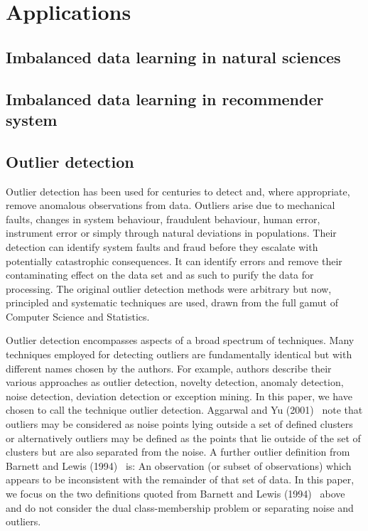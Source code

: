 \section{Applications}
\label{sec:application}
\subsection{Imbalanced data learning in natural sciences}
\subsection{Imbalanced data learning in recommender system}
\subsection{Outlier detection}
\noindent Outlier detection has been used for centuries to detect and, where appropriate, remove anomalous observations from data. Outliers arise due to mechanical faults, changes in system behaviour, fraudulent behaviour, human error, instrument error or simply through natural deviations in populations. Their detection can identify system faults and fraud before they escalate with potentially catastrophic consequences. It can identify errors and remove their contaminating effect on the data set and as such to purify the data for processing. The original outlier detection methods were arbitrary but now, principled and systematic techniques are used, drawn from the full gamut of Computer Science and Statistics.~\cite{ref_a1} 

Outlier detection encompasses aspects of a broad spectrum of techniques. Many techniques employed for detecting outliers are fundamentally identical but with different names chosen by the authors. For example, authors describe their various approaches as outlier detection, novelty detection, anomaly detection, noise detection, deviation detection or exception mining. In this paper, we have chosen to call the technique outlier detection. Aggarwal and Yu (2001) ~\cite{ref_c1}note that outliers may be considered as noise points lying outside a set of defined clusters or alternatively outliers may be defined as the points that lie outside of the set of clusters but are also separated from the noise. A further outlier definition from Barnett and Lewis (1994)~\cite{ref_b1} is:
An observation (or subset of observations) which appears to be inconsistent with the remainder of that set of data. In this paper, we focus on the two definitions quoted from Barnett and Lewis (1994)~\cite{ref_b1} above and do not consider the dual class-membership problem or separating noise and outliers.


